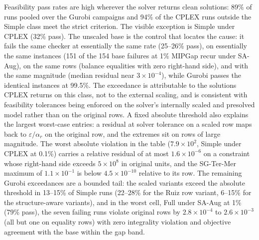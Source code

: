 \documentclass[AMA,Times1COL]{WileyNJDv5} %
\newcommand{\methodAug}{SA-Aug}
\providecommand{\DIFadd}[1]{{\protect\color{blue} \sf #1}} %
\begin{document}
\DIFadd{Feasibility pass rates are high wherever the solver returns clean solutions: 89\% of
runs pooled over the Gurobi campaigns and 94\% of the CPLEX runs outside the Simple
class meet the strict criterion. The visible exception is Simple under CPLEX (32\%
pass). The unscaled base is the control that locates the cause: it fails the same
checker at essentially the same rate (25--26\% pass), on essentially the same instances
(151 of the 154 base failures at 1\% MIPGap recur under \methodAug{}), on the same rows
(balance equalities with zero right-hand side), and with the same magnitude (median
residual near $3\times10^{-4}$), while Gurobi passes the identical instances at
99.5\%. The exceedance is attributable to the solutions CPLEX returns on this class,
not to the external scaling, and is consistent with feasibility tolerances being
enforced on the solver's internally scaled and presolved model rather than on the
original rows. A fixed absolute threshold also explains the largest worst-case entries:
a residual at solver tolerance on a scaled row maps back to $\varepsilon/\alpha_r$ on
the original row, and the extremes sit on rows of large magnitude. The worst absolute
violation in the table ($7.9\times10^{2}$, Simple under CPLEX at 0.1\%) carries a
relative residual of at most $1.6\times10^{-6}$ on a constraint whose right-hand side
exceeds $5\times10^{8}$ in original units, and the SG-Ter-Mer maximum of
$1.1\times10^{-1}$ is below $4.5\times10^{-10}$ relative to its row. The remaining
Gurobi exceedances are a bounded tail: the scaled variants exceed the absolute
threshold in 13--15\% of Simple runs (22--28\% for the Ruiz row variant, 6--15\% for
the structure-aware variants), and in the worst cell, Full under \methodAug{} at 1\%
(79\% pass), the seven failing runs violate original rows by $2.8\times10^{-4}$ to
$2.6\times10^{-3}$ (all but one on equality rows) with zero integrality violation and
objective agreement with the base within the gap band.
}
\end{document}
